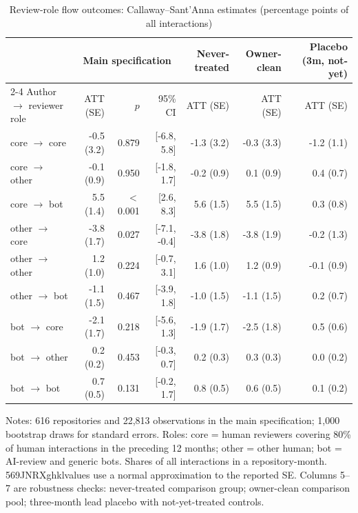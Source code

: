 \begin{table}[htbp]
\centering
\caption{Review-role flow outcomes: Callaway--Sant'Anna estimates (percentage points of all interactions)}\label{tab:role_flows}
\small
\begin{tabular}{lrrrrrr}
\toprule
 & \multicolumn{3}{c}{Main specification} & Never-treated & Owner-clean & Placebo (3m, not-yet)\\
\cmidrule(lr){2-4}
Author $\rightarrow$ reviewer role & ATT (SE) & $p$ & 95\% CI & ATT (SE) & ATT (SE) & ATT (SE)\\
\midrule
core $\rightarrow$ core & -0.5 (3.2) & 0.879 & [-6.8, 5.8] & -1.3 (3.2) & -0.3 (3.3) & -1.2 (1.1) \\
core $\rightarrow$ other & -0.1 (0.9) & 0.950 & [-1.8, 1.7] & -0.2 (0.9) & 0.1 (0.9) & 0.4 (0.7) \\
core $\rightarrow$ bot & 5.5 (1.4) & $<$0.001 & [2.6, 8.3] & 5.6 (1.5) & 5.5 (1.5) & 0.3 (0.8) \\
other $\rightarrow$ core & -3.8 (1.7) & 0.027 & [-7.1, -0.4] & -3.8 (1.8) & -3.8 (1.9) & -0.2 (1.3) \\
other $\rightarrow$ other & 1.2 (1.0) & 0.224 & [-0.7, 3.1] & 1.6 (1.0) & 1.2 (0.9) & -0.1 (0.9) \\
other $\rightarrow$ bot & -1.1 (1.5) & 0.467 & [-3.9, 1.8] & -1.0 (1.5) & -1.1 (1.5) & 0.2 (0.7) \\
bot $\rightarrow$ core & -2.1 (1.7) & 0.218 & [-5.6, 1.3] & -1.9 (1.7) & -2.5 (1.8) & 0.5 (0.6) \\
bot $\rightarrow$ other & 0.2 (0.2) & 0.453 & [-0.3, 0.7] & 0.2 (0.3) & 0.3 (0.3) & 0.0 (0.2) \\
bot $\rightarrow$ bot & 0.7 (0.5) & 0.131 & [-0.2, 1.7] & 0.8 (0.5) & 0.6 (0.5) & 0.1 (0.2) \\
\bottomrule
\end{tabular}
\par\smallskip
\footnotesize Notes: 616 repositories and 22{,}813 observations in the main specification; 1{,}000 bootstrap draws for standard errors. Roles: core = human reviewers covering 80\% of human interactions in the preceding 12 months; other = other human; bot = AI-review and generic bots. Shares of all interactions in a repository-month. 569JNRXghklvalues use a normal approximation to the reported SE. Columns 5--7 are robustness checks: never-treated comparison group; owner-clean comparison pool; three-month lead placebo with not-yet-treated controls.
\end{table}
